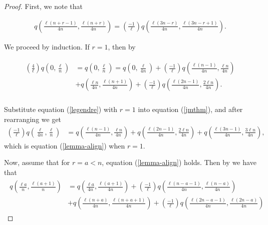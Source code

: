 \documentclass{article}
\theoremstyle{remark}
\theoremstyle{definition}
\begin{document}
\begin{proof}

    \par First, we note that
    
    \begin{align}q\left(\frac{\ell(n+r-1)}{4n}, \frac{\ell(n+r)}{4n} \right) = \left( \frac{-1}{\ell} \right) q \left(\frac{\ell(3n-r)}{4n}, \frac{\ell(3n-r+1)}{4n} \right). \label{legendre} \end{align}

    \par We proceed by induction. If $r = 1$, then by \cite[Main Theorem]{johnson_symmetries_1977} 
    
    \begin{align} \begin{split} \left(\frac{4}{\ell} \right)q \left(0, \frac{\ell}{n} \right) &=  q \left(0, \frac{\ell}{n} \right) =q \left(0, \frac{\ell}{4n} \right) + \left(\frac{-1}{\ell} \right)q\left(\frac{\ell(n-1)}{4n}, \frac{\ell n}{4n} \right) \\ &+ q \left(\frac{\ell n}{4n}, \frac{\ell(n+1)}{4n} \right) + \left(\frac{-1}{\ell} \right)q\left(\frac{\ell(2n-1)}{4n}, \frac{2\ell n}{4n} \right). \\
    \end{split} \label{jmthm} \end{align}
    
    \par Substitute equation (\ref{legendre}) with $r=1$ into equation (\ref{jmthm}), and after rearranging we get \begin{align*}
        \left(\frac{-1}{\ell} \right)q\left(\frac{\ell}{4n}, \frac{\ell}{n} \right) &= q\left(\frac{\ell(n-1)}{4n}, \frac{\ell n}{4n} \right) + q\left(\frac{\ell(2n-1)}{4n}, \frac{2\ell n}{4n} \right) + q\left(\frac{\ell(3n-1)}{4n}, \frac{3\ell n}{4n} \right),
    \end{align*}
    which is equation (\ref{lemma-align}) when $r = 1$.
    \par Now, assume that for $r = a < n$, equation (\ref{lemma-align}) holds. Then by \cite[Main Theorem]{johnson_symmetries_1977} we have that \begin{align} \begin{split} q \left (\frac{\ell a}{n}, \frac{\ell(a+1)}{n} \right ) &= q\left(\frac{\ell a}{4n} , \frac{\ell(a+1)}{4n} \right)  + \left(\frac{-1}{\ell} \right)q \left(\frac{\ell(n-a-1)}{4n}, \frac{\ell(n-a)}{4n} \right) \\ &+ q\left(\frac{\ell(n+a)}{4n}, \frac{\ell(n+a+1)}{4n} \right) + \left (\frac{-1}{\ell} \right) q \left(\frac{\ell(2n-a-1)}{4n}, \frac{\ell(2n-a)}{4n} \right) \end{split} \label{inductive} \end{align}
    

\end{proof}
\end{document}
